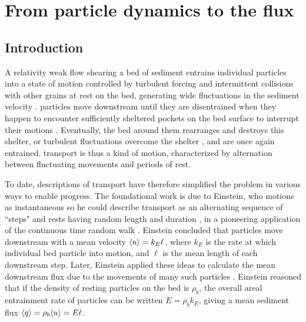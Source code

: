 
\chapter{From particle dynamics to the \DIFdelbegin {}\DIFdelend \DIFaddbegin {}\DIFaddend flux}
\label{ch:flux}
\section{Introduction}

A relativity weak flow shearing a bed of sediment entrains individual particles into a state of motion controlled by turbulent forcing and intermittent collisions with other grains at rest on the bed, generating wide fluctuations in the sediment velocity \citep{Heyman2016,Fathel2015}.
\DIFdelbegin {}\DIFdelend \DIFaddbegin {}\DIFaddend particles move downstream until they are disentrained when they happen to encounter sufficiently sheltered pockets on the bed surface to interrupt their motions \citep{Charru2004,Gordon1972}.
Eventually, the bed around them rearranges and destroys this shelter, or turbulent fluctuations overcome the shelter \citep{Celik2014,Valyrakis2010}, and \DIFdelbegin {}\DIFdelend \DIFaddbegin {}\DIFaddend are once again entrained.
\DIFdelbegin {}\DIFdelend \DIFaddbegin {}\DIFaddend transport is thus a kind of \DIFdelbegin {}\DIFdelend \DIFaddbegin {}\DIFaddend motion, characterized by alternation between fluctuating movements and periods of rest.
\DIFdelbegin {}\DIFdelend 

To date, descriptions of \DIFdelbegin {}\DIFdelend \DIFaddbegin {}\DIFaddend transport have therefore simplified the problem in various ways to enable progress.
The foundational work is due to Einstein, who \DIFdelbegin {}\DIFdelend \DIFaddbegin {}\DIFaddend motions as instantaneous so he could describe \DIFdelbegin {}\DIFdelend \DIFaddbegin {}\DIFaddend transport as an alternating sequence of ``steps" and rests having random length and duration \citep{Einstein1937}, in a pioneering application of the continuous time random walk \citep{Montroll1965}.
Einstein concluded that particles move downstream with a mean velocity $\langle u \rangle = k_E \ell$, where $k_E$ is the rate at which \DIFdelbegin {}\DIFdelend \DIFaddbegin {}\DIFaddend individual bed particle \DIFdelbegin {}\DIFdelend \DIFaddbegin {}\DIFaddend into motion, and $\ell$ is the mean length of each downstream step.
Later, Einstein applied these ideas to calculate the mean downstream flux due to the movements of many such particles \citep{Einstein1950}. Einstein reasoned that if the density of resting particles on the bed is $\rho_b$, the overall areal entrainment rate of particles can be written $E = \rho_b k_E$, giving a mean sediment flux $\langle q \rangle = \rho_b \langle u \rangle  = E \ell $.

